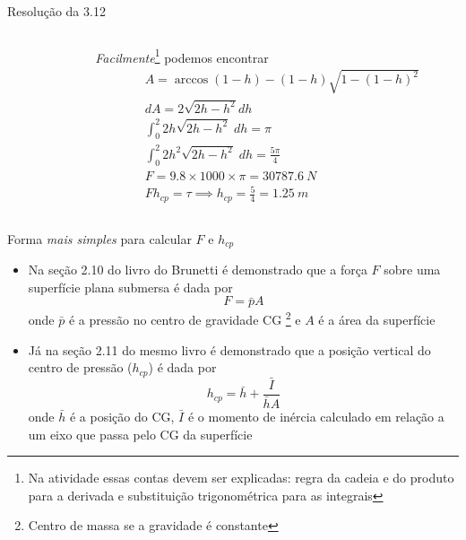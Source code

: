 \documentclass[t,%
brazilian,%
11pt,%
aspectratio=169,%
table%
]{beamer}
\begin{document}
 \begin{frame}{Resolução da 3.12}
     \begin{columns}[T]
         \begin{column}{0.4\textwidth}
         \end{column}
         \begin{column}{0.55\textwidth}
             \textit{Facilmente}\footnote{Na atividade essas contas devem ser explicadas: regra da cadeia
             e do produto para a derivada e substituição trigonométrica para as integrais} podemos 
             encontrar
             \begin{align*}
                 & A=\arccos{(1-h)}-(1-h)\sqrt{1-(1-h)^2} \\
                 & dA = 2\sqrt{2h - h^2}dh \\
                 & \int_0^2 2 h\sqrt{2h-h^2}\; dh = \pi \\
                 & \int_0^2 2 h^2\sqrt{2h-h^2}\; dh =\frac{5\pi}{4} \\
                 & F = 9.8 \times 1000 \times \pi = \SI{30787.6}{N} \\
                 & F h_{cp} = \tau \implies h_{cp} = \frac{5}{4} = \SI{1.25}{m}
             \end{align*}
         \end{column}
     \end{columns}
 \end{frame}

\begin{frame}{Forma \textit{mais simples} para calcular \(F\) e \(h_{cp}\)}
    \begin{itemize}
        \item Na seção 2.10 do livro do Brunetti é demonstrado que a força
            \(F\) sobre uma superfície plana submersa é dada por
            \[
                F = \bar{p}{A}
            \]
            onde \(\bar{p}\) é a pressão no centro de gravidade CG \footnote{Centro de massa se
            a gravidade é constante} e \(A\) é a área da superfície
        \item Já na seção 2.11 do mesmo livro é demonstrado que a posição
            vertical do centro de pressão (\(h_{cp}\)) é dada por
            \[
                h_{cp} = \bar{h}+\frac{\bar{I}}{\bar{h}A}
            \]
            onde \(\bar{h}\) é a posição do CG, \(\bar{I}\) é o momento de inércia
            calculado em relação a um eixo que passa pelo CG da superfície
    \end{itemize}
\end{frame}
\end{document}
